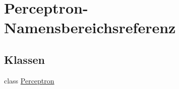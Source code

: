 \hypertarget{namespace_perceptron}{}\section{Perceptron-\/\+Namensbereichsreferenz}
\label{namespace_perceptron}
\subsection*{Klassen}
\begin{DoxyCompactItemize}
\item 
class \mbox{\hyperlink{class_perceptron_1_1_perceptron}{Perceptron}}
\end{DoxyCompactItemize}
